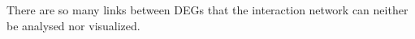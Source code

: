 
There are so many links between DEGs that the interaction network can neither
be analysed nor visualized.

